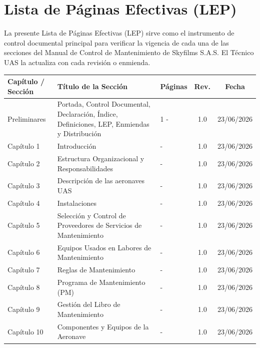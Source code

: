 \section*{Lista de Páginas Efectivas (LEP)}

La presente Lista de Páginas Efectivas (LEP) sirve como el instrumento de control documental principal para verificar la vigencia de cada una de las secciones del Manual de Control de Mantenimiento de Skyfilms S.A.S. El Técnico UAS la actualiza con cada revisión o enmienda.

\begin{longtable}{|p{2.6cm}|p{6.2cm}|p{2.4cm}|c|c|}
\hline
\rowcolor[gray]{0.8}
\textbf{Capítulo / Sección} & \textbf{Título de la Sección} & \textbf{Páginas} & \textbf{Rev.} & \textbf{Fecha} \\ \hline
\endhead
Preliminares & Portada, Control Documental, Declaración, Índice, Definiciones, LEP, Enmiendas y Distribución & 1 - \pageref{fin_prelim} & 1.0 & 23/06/2026 \\ \hline
Capítulo 1 & Introducción & \pageref{inicio_cap1} - \pageref{fin_cap1} & 1.0 & 23/06/2026 \\ \hline
Capítulo 2 & Estructura Organizacional y Responsabilidades & \pageref{inicio_cap2} - \pageref{fin_cap2} & 1.0 & 23/06/2026 \\ \hline
Capítulo 3 & Descripción de las aeronaves UAS & \pageref{inicio_cap3} - \pageref{fin_cap3} & 1.0 & 23/06/2026 \\ \hline
Capítulo 4 & Instalaciones & \pageref{inicio_cap4} - \pageref{fin_cap4} & 1.0 & 23/06/2026 \\ \hline
Capítulo 5 & Selección y Control de Proveedores de Servicios de Mantenimiento & \pageref{inicio_cap5} - \pageref{fin_cap5} & 1.0 & 23/06/2026 \\ \hline
Capítulo 6 & Equipos Usados en Labores de Mantenimiento & \pageref{inicio_cap6} - \pageref{fin_cap6} & 1.0 & 23/06/2026 \\ \hline
Capítulo 7 & Reglas de Mantenimiento & \pageref{inicio_cap7} - \pageref{fin_cap7} & 1.0 & 23/06/2026 \\ \hline
Capítulo 8 & Programa de Mantenimiento (PM) & \pageref{inicio_cap8} - \pageref{fin_cap8} & 1.0 & 23/06/2026 \\ \hline
Capítulo 9 & Gestión del Libro de Mantenimiento & \pageref{inicio_cap9} - \pageref{fin_cap9} & 1.0 & 23/06/2026 \\ \hline
Capítulo 10 & Componentes y Equipos de la Aeronave & \pageref{inicio_cap10} - \pageref{fin_cap10} & 1.0 & 23/06/2026 \\ \hline

\end{longtable}
